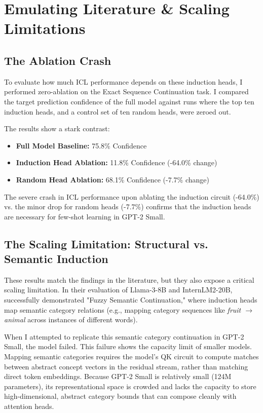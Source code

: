 \documentclass[11pt]{article}
\begin{document}
\section{Emulating Literature \& Scaling Limitations}

\subsection{The Ablation Crash}

To evaluate how much ICL performance depends on these induction heads, I performed zero-ablation on the Exact Sequence Continuation task. I compared the target prediction confidence of the full model against runs where the top ten induction heads, and a control set of ten random heads, were zeroed out.

The results show a stark contrast:
\begin{itemize}
    \item \textbf{Full Model Baseline:} 75.8\% Confidence
    \item \textbf{Induction Head Ablation:} 11.8\% Confidence (-64.0\% change)
    \item \textbf{Random Head Ablation:} 68.1\% Confidence (-7.7\% change)
\end{itemize}

The severe crash in ICL performance upon ablating the induction circuit (-64.0\%) vs. the minor drop for random heads (-7.7\%) confirms that the induction heads are necessary for few-shot learning in GPT-2 Small.

\subsection{The Scaling Limitation: Structural vs. Semantic Induction}

These results match the findings in the literature, but they also expose a critical scaling limitation. In their evaluation of Llama-3-8B and InternLM2-20B, \citet{crosbie2024} successfully demonstrated "Fuzzy Semantic Continuation," where induction heads map semantic category relations (e.g., mapping category sequences like \textit{fruit $\rightarrow$ animal} across instances of different words). 

When I attempted to replicate this semantic category continuation in GPT-2 Small, the model failed. This failure shows the capacity limit of smaller models. Mapping semantic categories requires the model's QK circuit to compute matches between abstract concept vectors in the residual stream, rather than matching direct token embeddings. Because GPT-2 Small is relatively small (124M parameters), its representational space is crowded and lacks the capacity to store high-dimensional, abstract category bounds that can compose cleanly with attention heads.
\end{document}
